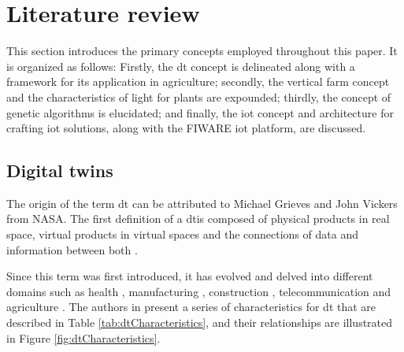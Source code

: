 \documentclass[preprint, review, 12pt]{elsarticle}
\begin{document}
\section{Literature review}
\label{sec:lr}

This section introduces the primary concepts employed throughout this paper. It is organized as follows: Firstly, the \gls{dt} concept is delineated along with a framework for its application in agriculture; secondly, the vertical farm concept and the characteristics of light for plants are expounded; thirdly, the concept of genetic algorithms is elucidated; and finally, the \gls{iot} concept and architecture for crafting \gls{iot} solutions, along with the FIWARE \gls{iot} platform, are discussed.

\subsection{Digital twins}
\label{sec:dt}

The origin of the term \gls{dt} can be attributed to Michael Grieves and John Vickers from NASA. The first definition of a \gls{dt}is composed of physical products in real space, virtual products in virtual spaces and the connections of data and information between both \cite{grieves2014digital}. 


Since this term was first introduced, it has evolved and delved into different domains \cite{barricelli2019} such as health \cite{corral-acero2020}, manufacturing \cite{leng2021, wang2023}, construction \cite{boje2020}, telecommunication \cite{jamshidi2024, feng2023, zhao2020} and agriculture \cite{pylianidis2021a}. The authors in \cite{jones2020} present a series of characteristics for \gls{dt} that are described in Table \ref{tab:dtCharacteristics}, and their relationships are illustrated in Figure \ref{fig:dtCharacteristics}.
\end{document}

